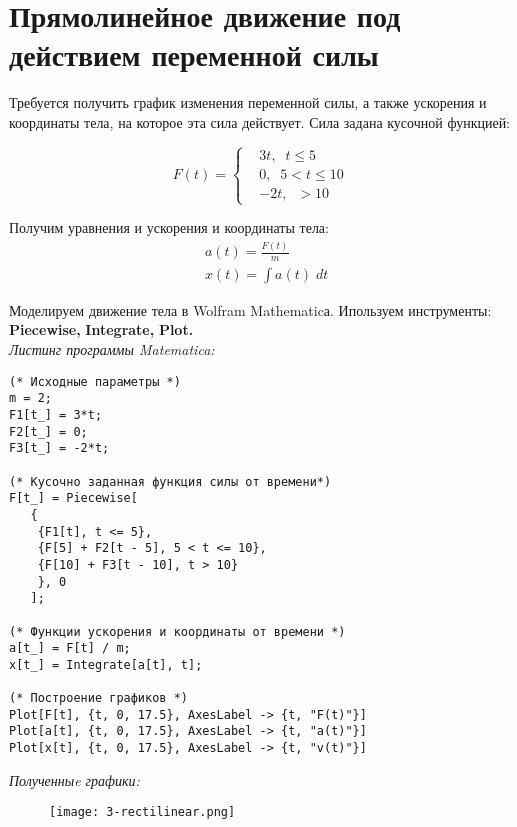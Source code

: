 \section[Прямолинейное движение под действием переменной силы]{Прямолинейное движение под действием переменной силы}

Требуется получить график изменения переменной силы, а также ускорения и координаты тела, на которое эта сила действует.
Сила задана кусочной функцией:

\begin{equation*}
    F(t) = 
    \left\{
        \begin{aligned}
            &3t,\;\; t \leq 5\\
            &0, \;\; 5 < t \leq 10\\
            &-2t, \;\; > 10
        \end{aligned}
    \right. 
\end{equation*}

Получим уравнения и ускорения и координаты тела:
\begin{equation*}
    \begin{aligned}
        &a(t) = \frac{F(t)}{m}\\
        &x(t) = \int a(t)\;dt
    \end{aligned}
\end{equation*}

Моделируем движение тела в Wolfram Mathematicа. 
Ипользуем инструменты: 
\textbf{Piecewise,} 
\textbf{Integrate,} 
\textbf{Plot.}\\[10pt]

\textit{Листинг программы Matematica:}
\begin{lstlisting}
(* Исходные параметры *)
m = 2;
F1[t_] = 3*t;
F2[t_] = 0;
F3[t_] = -2*t;

(* Кусочно заданная функция силы от времени*)
F[t_] = Piecewise[ 
   {
    {F1[t], t <= 5}, 
    {F[5] + F2[t - 5], 5 < t <= 10},
    {F[10] + F3[t - 10], t > 10}
    }, 0
   ];

(* Функции ускорения и координаты от времени *)
a[t_] = F[t] / m;
x[t_] = Integrate[a[t], t];

(* Построение графиков *)
Plot[F[t], {t, 0, 17.5}, AxesLabel -> {t, "F(t)"}]
Plot[a[t], {t, 0, 17.5}, AxesLabel -> {t, "a(t)"}]
Plot[x[t], {t, 0, 17.5}, AxesLabel -> {t, "v(t)"}]
\end{lstlisting} 
\textit{Полученныe графики:}
\begin{figure}[ht]
\centering
    \texttt{[image: 3-rectilinear.png]}
\end{figure}
